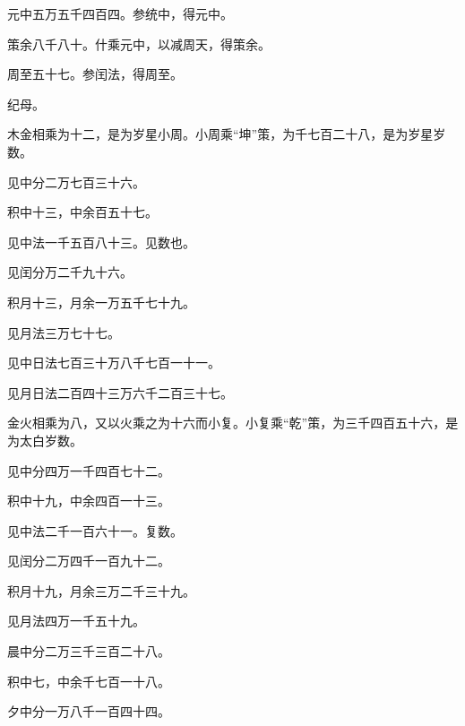 \documentclass[12pt,UTF8]{ctexbook}
\begin{document}
元中五万五千四百四。参统中，得元中。



策余八千八十。什乘元中，以减周天，得策余。



周至五十七。参闰法，得周至。



纪母。



木金相乘为十二，是为岁星小周。小周乘“坤”策，为千七百二十八，是为岁星岁数。



见中分二万七百三十六。



积中十三，中余百五十七。



见中法一千五百八十三。见数也。



见闰分万二千九十六。



积月十三，月余一万五千七十九。



见月法三万七十七。



见中日法七百三十万八千七百一十一。



见月日法二百四十三万六千二百三十七。



金火相乘为八，又以火乘之为十六而小复。小复乘“乾”策，为三千四百五十六，是为太白岁数。



见中分四万一千四百七十二。



积中十九，中余四百一十三。



见中法二千一百六十一。复数。



见闰分二万四千一百九十二。



积月十九，月余三万二千三十九。



见月法四万一千五十九。



晨中分二万三千三百二十八。



积中七，中余千七百一十八。



夕中分一万八千一百四十四。
\end{document}
